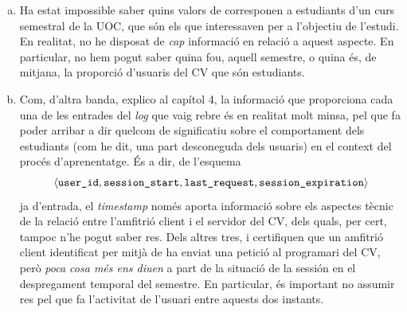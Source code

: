 \documentclass[
	a4paper,
	twoside,
	justified
]{tufte-handout}
\begin{document}
\begin{enumerate}[(a)]

  \item Ha estat impossible saber quins valors de  corresponen a estudiants d'un curs semestral de la UOC, que són els que interessaven per a l'objectiu de l'estudi. En realitat, no he disposat de \emph{cap} informació en relació a aquest aspecte. En particular, no hem pogut saber quina fou, aquell semestre, o quina és, de mitjana, la proporció d'usuaris del CV que són estudiants.  
  
  \item Com, d'altra banda, explico al capítol 4, la informació que proporciona cada una de les entrades del \emph{log} que vaig rebre és en realitat molt minsa, pel que fa poder arribar a dir quelcom de significatiu sobre el comportament dels estudiants (com he dit, una part desconeguda dels usuaris) en el context del procés d'aprenentatge. És a dir, de l'esquema
  $$
    \langle \texttt{user\_id}, \texttt{session\_start}, \texttt{last\_request}, \texttt{session\_expiration} \rangle
  $$
  ja d'entrada, el \emph{timestamp}  només aporta informació sobre els aspectes tècnic de la relació entre l'amfitrió client i el servidor del CV, dels quals, per cert, tampoc n'he pogut saber res. Dels altres tres,  i  certifiquen que un amfitrió client identificat per mitjà de  ha enviat una petició al programari del CV, però \emph{poca cosa més ens diuen} a part de la situació de la sessión en el despregament temporal del semestre. En particular, és important no assumir res pel que fa l'activitat de l'usuari entre aquests dos instants.    
          
\end{enumerate}
\end{document}
